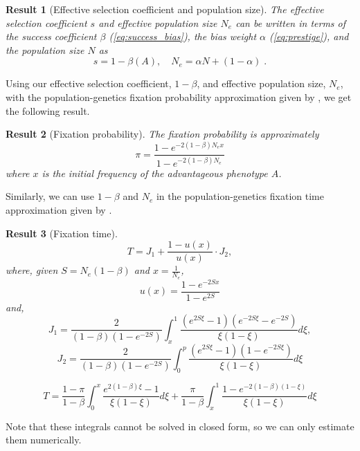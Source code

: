 \documentclass[12pt]{extarticle}
\newtheorem{result}{Result}
\begin{document}
\begin{result}[Effective selection coefficient and population size]\label{res:selection_coef}
The effective selection coefficient $s$ and effective population size $N_e$ can be written in terms of the success coefficient $\beta$ (\cref{eq:success_bias}), the bias weight $\alpha$ (\cref{eq:prestige}), and the population size $N$ as 
\begin{equation}
s=1-\beta(A), \quad N_e=\alpha N + (1-\alpha) \;.
\end{equation}
\end{result}

Using our effective selection coefficient, $1-\beta$, and effective population size, $N_e$, with the population-genetics fixation probability approximation given by \citet[eq.~8]{kimura}, we get the following result.\\

\begin{result}[Fixation probability]
The fixation probability is approximately
\begin{equation}\label{eq:kimura_p}
\pi = \frac{1-e^{-2(1-\beta)N_e x}}{1-e^{-2(1-\beta)N_e}}
\end{equation}
where $x$ is the initial frequency of the advantageous phenotype $\hat{A}$.
\end{result}

Similarly, we can use $1-\beta$ and $N_e$ in the population-genetics fixation time approximation given by \citet[eq.~17]{kimura_average}.\\


\begin{result}[Fixation time]
\begin{equation}
T = J_1 + \frac{1-u(x)}{u(x)}\cdot J_2,
\end{equation}
where, given $S=N_e(1-\beta)$ and $x=\frac{1}{N_e}$,
\begin{equation}
u(x)=\frac{1-e^{-2Sx}}{1-e^{2S}}
\end{equation}
and,
\begin{equation}
J_1 = \frac{2}{(1-\beta)(1-e^{-2S})}\int_x^1 \frac{(e^{2S\xi}-1)(e^{-2S\xi}-e^{-2S})}{\xi(1-\xi)}d\xi,
\end{equation}
\begin{equation}
J_2= \frac{2}{(1-\beta)(1-e^{-2S})}\int_0^p \frac{(e^{2S\xi}-1)(1-e^{-2S\xi})}{\xi(1-\xi)}d\xi
\end{equation}

\begin{equation}\label{eq:kimura_t}
T = \frac{1-\pi}{1-\beta}\int_0^x\frac{e^{2(1-\beta) \xi}-1}{\xi(1-\xi)}d\xi+ \frac{\pi}{1-\beta}\int_x^1\frac{1-e^{-2(1-\beta)(1-\xi)}}{\xi(1-\xi)}d\xi
\end{equation}
\end{result}
Note that these integrals cannot be solved in closed form, so we can only estimate them numerically.
\end{document}

